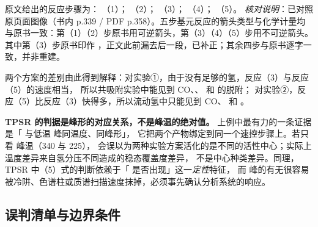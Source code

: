 原文给出的反应步骤为：
（1）；
（2）；
（3）；
（4）；
（5）。
\emph{核对说明}：已对照原页面图像（书内 p.339 / PDF p.358）。五步基元反应的箭头类型与化学计量均与原书一致：第（1）（2）步原书用可逆箭头，第（3）（4）（5）步用不可逆箭头。其中第（3）步原书印作 ，正文此前漏去后一段，已补正；其余四步与原书逐字一致，并非重建。

两个方案的差别由此得到解释：对实验①，由于没有足够的氢，反应（3）与反应（5）的速度相当，
所以共吸附实验中能见到 CO、、 和  的脱附；
对实验②，反应（5）比反应（3）快得多，所以流动氢中只能见到 CO、 和 。

\begin{pitfall}
\textbf{TPSR 的判据是峰形的对应关系，不是峰温的绝对值。}
上例中最有力的一条证据是「 与低温  峰同温度、同峰形」，
它把两个产物绑定到同一个速控步骤上。若只看  峰温（\qty{340}{\degC} 与 \qty{225}{\degC}），
会误以为两种实验方案活化的是不同的活性中心；实际上温度差异来自氢分压不同造成的稳态覆盖度差异，
不是中心种类差异。同理，TPSR 中（5）式的判断依赖于「 是否出现」这一\emph{定性}特征，
而  峰的有无很容易被冷阱、色谱柱或质谱扫描速度抹掉，必须事先确认分析系统的响应。
\end{pitfall}

\subsection{误判清单与边界条件}
\label{sec:ch05b-pitfall}

